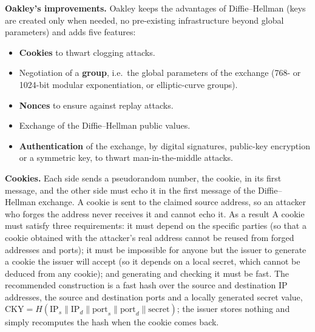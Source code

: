 \textbf{Oakley's improvements.} Oakley keeps the advantages of Diffie--Hellman (keys are created only when needed, no pre-existing infrastructure beyond global parameters) and adds five features:
\begin{itemize}
  \item \textbf{Cookies} to thwart clogging attacks.
  \item Negotiation of a \textbf{group}, i.e.\ the global parameters of the exchange (768- or 1024-bit modular exponentiation, or elliptic-curve groups).
  \item \textbf{Nonces} to ensure against replay attacks.
  \item Exchange of the Diffie--Hellman public values.
  \item \textbf{Authentication} of the exchange, by digital signatures, public-key encryption or a symmetric key, to thwart man-in-the-middle attacks.
\end{itemize}

\textbf{Cookies.} Each side sends a pseudorandom number, the cookie, in its first message, and the other side must echo it in the first message of the Diffie--Hellman exchange. A cookie is sent to the claimed source address, so an attacker who forges the address never receives it and cannot echo it. As a result  A cookie must satisfy three requirements: it must depend on the specific parties (so that a cookie obtained with the attacker's real address cannot be reused from forged addresses and ports); it must be impossible for anyone but the issuer to generate a cookie the issuer will accept (so it depends on a local secret, which cannot be deduced from any cookie); and generating and checking it must be fast. The recommended construction is a fast hash over the source and destination IP addresses, the source and destination ports and a locally generated secret value, $\mathrm{CKY} = H(\mathrm{IP}_s \| \mathrm{IP}_d \| \mathrm{port}_s \| \mathrm{port}_d \| \text{secret})$; the issuer stores nothing and simply recomputes the hash when the cookie comes back.

